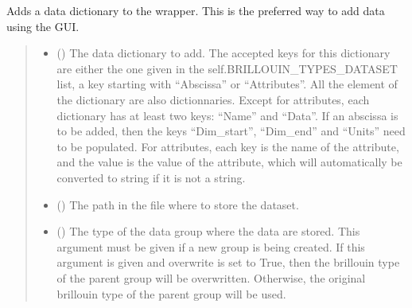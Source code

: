 \documentclass[letterpaper,10pt,english]{sphinxmanual}
\begin{document}
\begin{fulllineitems}
\begin{fulllineitems}
\end{fulllineitems}


\begin{fulllineitems}
\label{\detokenize{_autosummary/HDF5_BLS.wrapper:HDF5_BLS.wrapper.Wrapper.add_dictionary}}
\pysigstartsignatures
\pysiglinewithargsret
{}
{\sphinxparamcomma {}\sphinxparamcomma {}\sphinxparamcomma {}\sphinxparamcomma {}}
{}
\pysigstopsignatures
\sphinxAtStartPar
Adds a data dictionary to the wrapper. This is the preferred way to add data using the GUI.
\begin{quote}\begin{description}
\begin{itemize}
\item {} 
\sphinxAtStartPar
{} () \textendash{} The data dictionary to add. The accepted keys for this dictionary are either the one given in the self.BRILLOUIN\_TYPES\_DATASET list, a key starting with “Abscissa” or “Attributes”.
All the element of the dictionary are also dictionnaries.
Except for attributes, each dictionary has at least two keys: “Name” and “Data”. If an abscissa is to be added, then the keys “Dim\_start”, “Dim\_end” and “Units” need to be populated.
For attributes, each key is the name of the attribute, and the value is the value of the attribute, which will automatically be converted to string if it is not a string.

\item {} 
\sphinxAtStartPar
{} (\sphinxstyleliteralemphasis{\sphinxupquote{, }}) \textendash{} The path in the file where to store the dataset.

\item {} 
\sphinxAtStartPar
{} (\sphinxstyleliteralemphasis{\sphinxupquote{, }}) \textendash{} The type of the data group where the data are stored. This argument must be given if a new group is being created. If this argument is given and overwrite is set to True, then the brillouin type of the parent group will be overwritten. Otherwise, the original brillouin type of the parent group will be used.


\end{itemize}
\end{description}
\end{quote}
\end{fulllineitems}
\end{fulllineitems}
\end{document}
